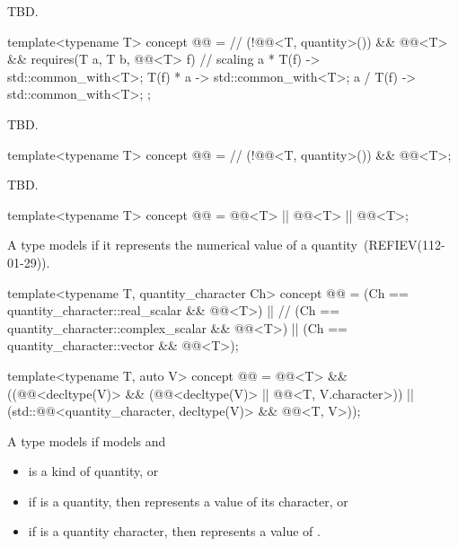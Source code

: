 \pnum
TBD.

\begin{itemdecl}
template<typename T>
concept @@ =  // \expos
  (!@@<T, quantity>()) && @@<T> &&
  requires(T a, T b, @@<T> f) {
    // scaling
    { a * T(f) } -> std::common_with<T>;
    { T(f) * a } -> std::common_with<T>;
    { a / T(f) } -> std::common_with<T>;
  };
\end{itemdecl}

\pnum
TBD.

\begin{itemdecl}
template<typename T>
concept @@ =  // \expos
  (!@@<T, quantity>()) && @@<T>;
\end{itemdecl}

\pnum
TBD.

\begin{itemdecl}
template<typename T>
concept @@ = @@<T> || @@<T> ||
                         @@<T>;
\end{itemdecl}

\pnum
A type  models  if
it represents the numerical value of a quantity~(REFIEV(112-01-29)).

\begin{itemdecl}
template<typename T, quantity_character Ch>
concept @@ = (Ch == quantity_character::real_scalar && @@<T>) ||  // \expos
                        (Ch == quantity_character::complex_scalar && @@<T>) ||
                        (Ch == quantity_character::vector && @@<T>);

template<typename T, auto V>
concept @@ =
  @@<T> && ((@@<decltype(V)> &&
                         (@@<decltype(V)> || @@<T, V.character>)) ||
                        (std::@@<quantity_character, decltype(V)> && @@<T, V>));
\end{itemdecl}

\pnum
A type  models  if
 models  and
\begin{itemize}
\item
{} is a kind of quantity, or
\item
if  is a quantity, then  represents a value of its character, or
\item
if  is a quantity character, then  represents a value of .
\end{itemize}


